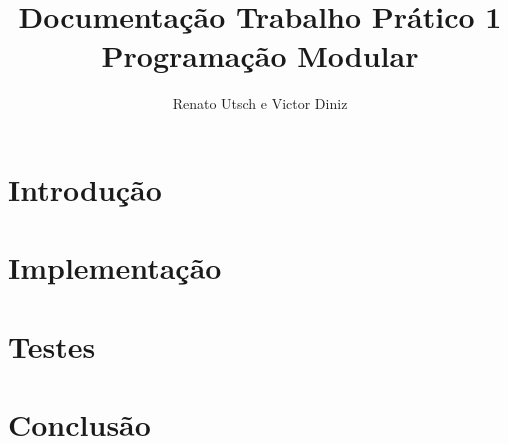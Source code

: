 \documentclass{article}
\author{Renato Utsch e Victor Diniz}
\title{Documentação Trabalho Prático 1\\Programação Modular}
\begin{document}
\maketitle

\section{Introdução}

\section{Implementação}

\section{Testes}

\section{Conclusão}

\cite{javadoc}


\end{document}
